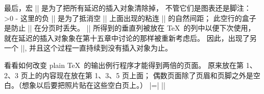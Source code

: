 \medbreak
{} 最后，宏 |\dosupereject| 是为了把所有延迟的插入对象清除掉，
不管它们是图表还是脚注：
\begintt
\ifnum\insertpenalties>0
  \line{} \kern-\topskip \nobreak
  \vfill\supereject\fi
\endtt
这里的负 |\kern| 是为了抵消空 |\line| 上面出现的粘连 |\topskip| 的自然间距；
此空行的盒子是防止 |\vfill| 在分页时丢失。%
|\dosupereject| 所得到的垂直列被放在 \TeX\ 的列中以便下次使用，
就在延迟的插入对象象在第十五章中讨论的那样被重新考虑后。%
因此，出现了另一个 |\supereject|, 并且这个过程一直持续到没有插入对象为止。

\ddangerexercise 看看如何改变 plain \TeX\ 的输出例行程序才能得到两倍的页面。
原来放在第 1、2、3 页上的内容现在放在第 1、3、5 页上面；
偶数页面除了页眉和页脚之外是空白。（想象以后要把照片贴在这些空白页上。）
\answer |\output={\plainoutput\blankpageoutput}|\parbreak
        |\def\blankpageoutput{\shipout\vbox{\makeheadline|\parbreak
        |    \vbox to\vsize{}\makefootline}\advancepageno}|

